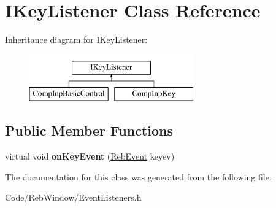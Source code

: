 \hypertarget{class_i_key_listener}{}\section{I\+Key\+Listener Class Reference}
\label{class_i_key_listener}
Inheritance diagram for I\+Key\+Listener\+:\begin{figure}[H]
\begin{center}
\leavevmode
\includegraphics[height=2.000000cm]{class_i_key_listener}
\end{center}
\end{figure}
\subsection*{Public Member Functions}
\begin{DoxyCompactItemize}
\item 
virtual void {\bfseries on\+Key\+Event} (\hyperlink{union_reb_event}{Reb\+Event} keyev)\hypertarget{class_i_key_listener_a53153f0f68d614e3524a3a3dd2f48f95}{}\label{class_i_key_listener_a53153f0f68d614e3524a3a3dd2f48f95}

\end{DoxyCompactItemize}


The documentation for this class was generated from the following file\+:\begin{DoxyCompactItemize}
\item 
Code/\+Reb\+Window/Event\+Listeners.\+h\end{DoxyCompactItemize}
